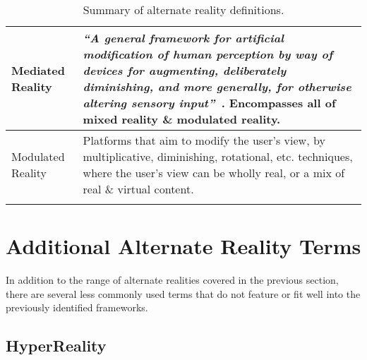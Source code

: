 \begin{center}
\begin{longtable}{ l p{10cm} }

\midrule


Mediated Reality & \textit{``A general framework for artificial modification of human perception by way of devices for augmenting, deliberately diminishing, and more generally, for otherwise altering sensory input''}~\cite{Mann2002a}. Encompasses all of mixed reality \& modulated reality. \\

\midrule


Modulated Reality & Platforms that aim to modify the user's view, by multiplicative, diminishing, rotational, etc. techniques, where the user's view can be wholly real, or a mix of real \& virtual content. \\

\bottomrule
\caption{Summary of alternate reality definitions.}
\end{longtable}
\end{center}


\section{Additional Alternate Reality Terms}

In addition to the range of alternate realities covered in the previous section, there are several less commonly used terms that do not feature or fit well into the previously identified frameworks.


\subsection{HyperReality}
\label{subsec_HyperReality}

